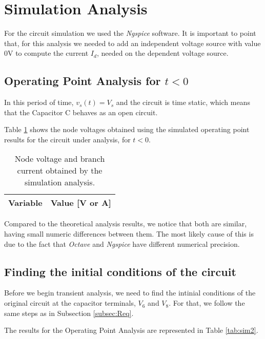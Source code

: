 \newpage

\section{Simulation Analysis}
\label{sec:simulation}

For the circuit simulation we used the \textit{Ngspice} software. It is important to point that, for this analysis we needed to add an independent voltage source with value 0V to compute the current $I_d$, needed on the dependent voltage source.

\subsection{Operating Point Analysis for $t<0$}
\label{subsec:op_point}

In this period of time, $v_s (t)= V_s$ and the circuit is time static, which means that the Capacitor C behaves as an open circuit. 

Table \ref{tab:sim1} shows the node voltages obtained using the simulated operating point results for the circuit under analysis, for $t<0$.
\begin{table}[H]
  \centering
  \begin{tabular}{|l|r|}
    \hline    
    {\bf Variable} & {\bf Value [V or A]} \\ \hline
    
  \end{tabular}
  \caption{Node voltage and branch current obtained by the simulation analysis.}
  \label{tab:sim1}
\end{table}

Compared to the theoretical analysis results, we notice that both are similar, having small numeric differences between them. The most likely cause of this is due to the fact that \textit{Octave} and \textit{Ngspice} have different numerical precision.

\newpage

\subsection{Finding the initial conditions of the circuit}
\label{subsec:init_conds}

Before we begin transient analysis, we need to find the intinial conditions of the original circuit at the capacitor terminals, $V_6$ and $V_8$. For that, we follow the same steps as in Subsection \ref{subsec:Req}.
\par
The results for the Operating Point Analysis are represented in Table \ref{tab:sim2}.

